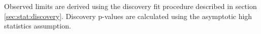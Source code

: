 \indent Observed limits are derived using the discovery fit procedure described in section \ref{sec:stat:discovery}.  Discovery p-values are calculated using the asymptotic high statistics assumption.  \\




